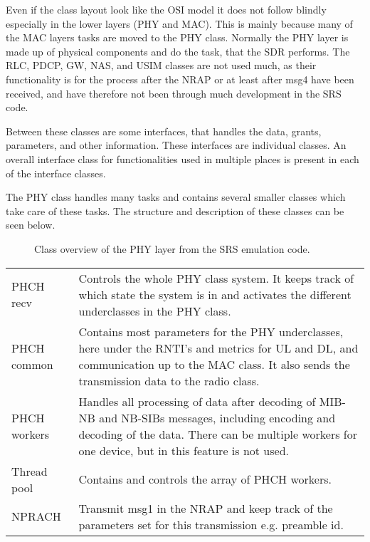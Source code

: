 Even if the class layout look like the OSI model it does not follow blindly especially in the lower layers (PHY and MAC). This is mainly because many of the MAC layers tasks are moved to the PHY class. Normally the PHY layer is made up of physical components and do the task, that the SDR performs. The RLC, PDCP, GW, NAS, and USIM classes are not used much, as their functionality is for the process after the NRAP or at least after msg4 have been received, and have therefore not been through much development in the SRS code.

Between these classes are some interfaces, that handles the data, grants, parameters, and other information. These interfaces are individual classes. An overall interface class for functionalities used in multiple places is present in each of the interface classes. 

The PHY class handles many tasks and contains several smaller classes which take care of these tasks. The structure and description of these classes can be seen below.

\begin{figure}[H]

\centering


\resizebox{0.5\textwidth}{!}{

}

\caption{Class overview of the PHY layer from the SRS emulation code.}

\label{fig:PhyClass}

\end{figure}

\begin{tabular}{lp{12cm}}

PHCH recv & Controls the whole PHY class system. It keeps track of which state the system is in and activates the different underclasses in the PHY class. \\

PHCH common & Contains most parameters for the PHY underclasses, here under the RNTI's and metrics for UL and DL, and communication up to the MAC class. It also sends the transmission data to the radio class. \\

PHCH workers & Handles all processing of data after decoding of MIB-NB and NB-SIBs messages, including encoding and decoding of the data. There can be multiple workers for one device, but in this feature is not used. \\

Thread pool & Contains and controls the array of PHCH workers. \\    

NPRACH & Transmit msg1 in the NRAP and keep track of the parameters set for this transmission e.g. preamble id. \\

\end{tabular}

